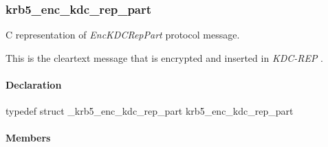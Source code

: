 \documentclass[letterpaper,10pt,english]{sphinxmanual}
\begin{document}

\begin{fulllineitems}
\label{appdev/refs/types/krb5_enc_data:c.krb5_enc_data.kvno}
\end{fulllineitems}


\begin{fulllineitems}
\label{appdev/refs/types/krb5_enc_data:c.krb5_enc_data.ciphertext}
\end{fulllineitems}



\subsubsection{krb5\_enc\_kdc\_rep\_part}
\label{appdev/refs/types/krb5_enc_kdc_rep_part::doc}\label{appdev/refs/types/krb5_enc_kdc_rep_part:krb5-enc-kdc-rep-part}\label{appdev/refs/types/krb5_enc_kdc_rep_part:krb5-enc-kdc-rep-part-struct}

\begin{fulllineitems}
\label{appdev/refs/types/krb5_enc_kdc_rep_part:c.krb5_enc_kdc_rep_part}
\end{fulllineitems}


C representation of \emph{EncKDCRepPart} protocol message.

This is the cleartext message that is encrypted and inserted in \emph{KDC-REP} .


\paragraph{Declaration}
\label{appdev/refs/types/krb5_enc_kdc_rep_part:declaration}
typedef struct \_krb5\_enc\_kdc\_rep\_part  krb5\_enc\_kdc\_rep\_part


\paragraph{Members}
\label{appdev/refs/types/krb5_enc_kdc_rep_part:members}

\begin{fulllineitems}
\label{appdev/refs/types/krb5_enc_kdc_rep_part:c.krb5_enc_kdc_rep_part.magic}
\end{fulllineitems}
\end{document}
